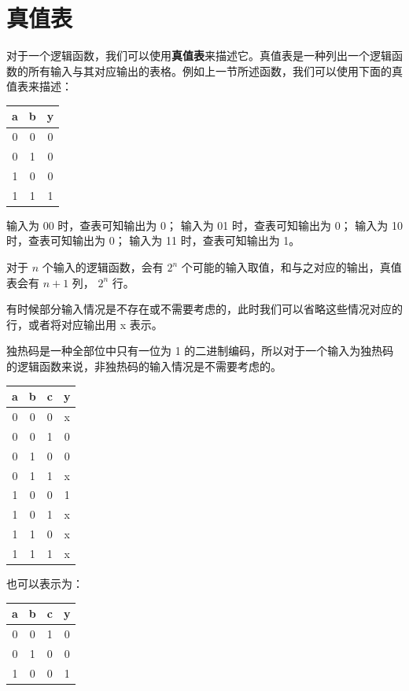 \section{真值表}

对于一个逻辑函数，我们可以使用\textbf{真值表}来描述它。真值表是一种列出一个逻辑函数的所有输入与其对应输出的表格。例如上一节所述函数，我们可以使用下面的真值表来描述：

\begin{example}{}{}
  \begin{longtable}{|c|c|c|}
  \hline
  \textbf{a} & \textbf{b} & \textbf{y} \\ \hline
  \endhead
  0 & 0 & 0 \\ \hline
  0 & 1 & 0 \\ \hline
  1 & 0 & 0 \\ \hline
  1 & 1 & 1 \\ \hline
  \end{longtable}

  输入为 00 时，查表可知输出为 0；
  输入为 01 时，查表可知输出为 0；
  输入为 10 时，查表可知输出为 0；
  输入为 11 时，查表可知输出为 1。
\end{example}

对于 $n$ 个输入的逻辑函数，会有 $2 ^ n$ 个可能的输入取值，和与之对应的输出，真值表会有 $n + 1$ 列， $2 ^ n$ 行。

有时候部分输入情况是不存在或不需要考虑的，此时我们可以省略这些情况对应的行，或者将对应输出用 x 表示。

\begin{example}{}{}
  独热码是一种全部位中只有一位为 1 的二进制编码，所以对于一个输入为独热码的逻辑函数来说，非独热码的输入情况是不需要考虑的。

  \begin{longtable}{|c|c|c|c|}
  \hline
  \textbf{a} & \textbf{b} & \textbf{c} & \textbf{y} \\ \hline
  \endhead
  0 & 0 & 0 & x \\ \hline
  0 & 0 & 1 & 0 \\ \hline
  0 & 1 & 0 & 0 \\ \hline
  0 & 1 & 1 & x \\ \hline
  1 & 0 & 0 & 1 \\ \hline
  1 & 0 & 1 & x \\ \hline
  1 & 1 & 0 & x \\ \hline
  1 & 1 & 1 & x \\ \hline
  \end{longtable}

  也可以表示为：

  \begin{longtable}{|c|c|c|c|}
  \hline
  \textbf{a} & \textbf{b} & \textbf{c} & \textbf{y} \\ \hline
  \endhead
  0 & 0 & 1 & 0 \\ \hline
  0 & 1 & 0 & 0 \\ \hline
  1 & 0 & 0 & 1 \\ \hline
  \end{longtable}
\end{example}

